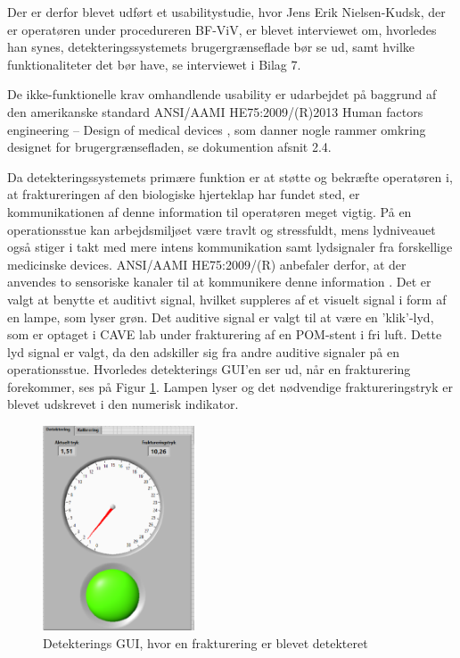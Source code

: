 Der er derfor blevet udført et usabilitystudie, hvor Jens Erik Nielsen-Kudsk, der er operatøren under procedureren BF-ViV, er blevet interviewet om, hvorledes han synes, detekteringssystemets brugergrænseflade bør se ud, samt hvilke funktionaliteter det bør have, se interviewet i Bilag 7. 

De ikke-funktionelle krav omhandlende usability er udarbejdet på baggrund af den amerikanske standard ANSI/AAMI HE75:2009/(R)2013 Human factors engineering – Design of medical devices \cite{standard1}, som danner nogle rammer omkring designet for brugergrænsefladen, se dokumention afsnit 2.4.  

Da detekteringssystemets primære funktion er at støtte og bekræfte operatøren i, at fraktureringen af den biologiske hjerteklap har fundet sted, er kommunikationen af denne information til operatøren meget vigtig. På en operationsstue kan arbejdsmiljøet være travlt og stressfuldt, mens lydniveauet også stiger i takt med mere intens kommunikation samt lydsignaler fra forskellige medicinske devices. ANSI/AAMI HE75:2009/(R) anbefaler derfor, at der anvendes to sensoriske kanaler til at kommunikere denne information \cite{standard1}. Det er valgt at benytte et auditivt signal, hvilket suppleres af et visuelt signal i form af en lampe, som lyser grøn. Det auditive signal er valgt til at være en 'klik'-lyd, som er optaget i CAVE lab under frakturering af en POM-stent i fri luft. Dette lyd signal er valgt, da den adskiller sig fra andre auditive signaler på en operationsstue. Hvorledes detekterings GUI'en ser ud, når en frakturering forekommer, ses på Figur \ref{detektering1}. Lampen lyser og det nødvendige fraktureringstryk er blevet udskrevet i den numerisk indikator. 

\begin{figure}[H]
	\centering
	\includegraphics[width=0.4\textwidth]{Figure/detekeringsgui}
	\caption{Detekterings GUI, hvor en frakturering er blevet detekteret}
    \label{detektering1}
\end{figure}

